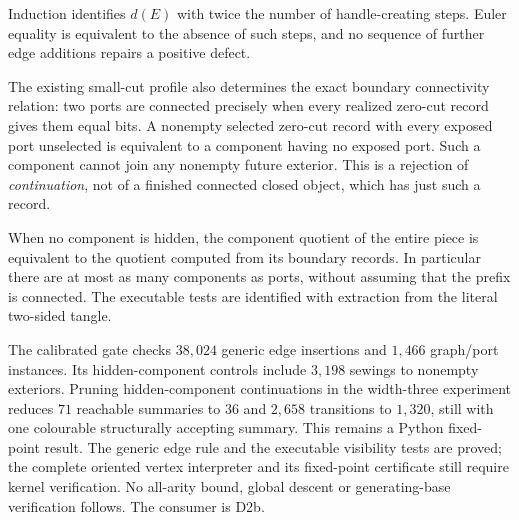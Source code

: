 Induction identifies $d(E)$ with twice the number of handle-creating
steps. Euler equality is equivalent to the absence of such steps, and
no sequence of further edge additions repairs a positive defect.

The existing small-cut profile also determines the exact boundary
connectivity relation: two ports are connected precisely when every
realized zero-cut record gives them equal bits. A nonempty selected
zero-cut record with every exposed port unselected is equivalent to a
component having no exposed port. Such a component cannot join any
nonempty future exterior. This is a rejection of \emph{continuation},
not of a finished connected closed object, which has just such a record.

When no component is hidden, the component quotient of the entire
piece is equivalent to the quotient computed from its boundary records.
In particular there are at most as many components as ports, without
assuming that the prefix is connected. The executable tests are
identified with extraction from the literal two-sided tangle.

The calibrated gate checks $38{,}024$ generic edge insertions and
$1{,}466$ graph/port instances. Its hidden-component controls include
$3{,}198$ sewings to nonempty exteriors. Pruning hidden-component
continuations in the width-three experiment reduces $71$ reachable
summaries to $36$ and $2{,}658$ transitions to $1{,}320$, still with
one colourable structurally accepting summary. This remains a Python
fixed-point result. The generic edge rule and the executable visibility
tests are proved; the complete oriented vertex interpreter and its
fixed-point certificate still require kernel verification. No
all-arity bound, global descent or generating-base verification follows.
The consumer is D2b.

